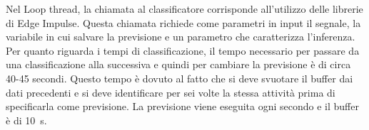 \noindent
Nel Loop thread, la chiamata al classificatore corrisponde all'utilizzo delle librerie di Edge Impulse. Questa chiamata richiede come parametri in input il segnale, la variabile in cui salvare la previsione e un parametro che caratterizza l'inferenza. Per quanto riguarda i tempi di classificazione, il tempo necessario per passare da una classificazione alla successiva e quindi per cambiare la previsione è di circa 40-45 secondi. Questo tempo è dovuto al fatto che si deve svuotare il buffer dai dati precedenti e si deve identificare per sei volte la stessa attività prima di specificarla come previsione. La previsione viene eseguita ogni secondo e il buffer è di \SI{10}{\second}. 